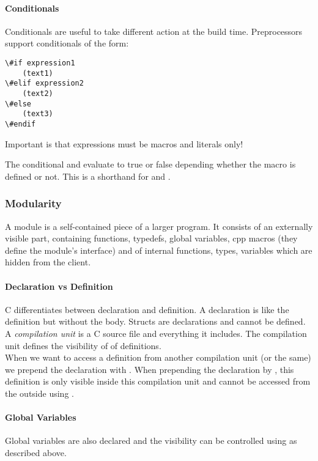 \paragraph{Conditionals}
Conditionals are useful to take different action at the build time. Preprocessors support conditionals of the form:
\begin{lstlisting}
\#if expression1
    (text1)
\#elif expression2
    (text2)
\#else
    (text3)
\#endif
\end{lstlisting}

Important is that expressions must be macros and literals only!

The conditional  and  evaluate to true or false depending whether the macro is defined or not. This is a shorthand for  and .

\subsubsection{Modularity}
A module is a self-contained piece of a larger program. It consists of an externally visible part, containing functions, typedefs, global variables, cpp macros (they define the module's interface) and of internal functions, types, variables which are hidden from the client.

\paragraph{Declaration vs Definition}
C differentiates between declaration and definition. A declaration is like the definition but without the body. Structs are declarations and cannot be defined.\\
A \textit{compilation unit} is a C source file and everything it includes. The compilation unit defines the visibility of of definitions.\\
When we want to access a definition from another compilation unit (or the same) we prepend the declaration with . When prepending the declaration by , this definition is only visible inside this compilation unit and cannot be accessed from the outside using .

\paragraph{Global Variables}
Global variables are also declared and the visibility can be controlled using  as described above.

